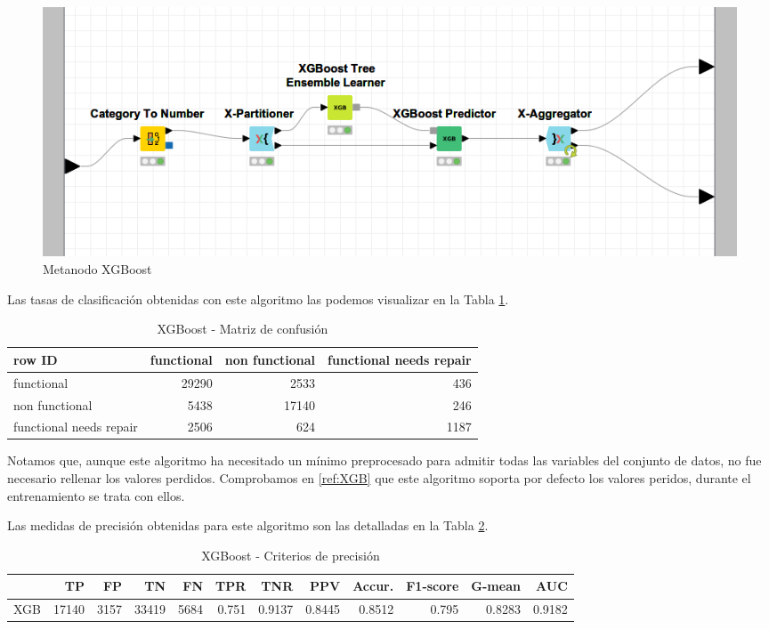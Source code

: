 \documentclass[a4paper, 20pt]{article}
\begin{document}
\begin{figure}[H]
    \centering
    \includegraphics[width=1\textwidth]{XGBoost}
    \caption{Metanodo XGBoost}
    \label{fig:XGBoost}
\end{figure}

Las tasas de clasificación obtenidas con este algoritmo las podemos visualizar en la Tabla \ref{tab:CMXGB}.

\begin{table}[H]
  \centering
  \caption{XGBoost - Matriz de confusión}
  \label{tab:CMXGB} 
  \begin{tabular}{lrrr}
    \toprule
    row ID & functional & non functional & functional needs repair\\ \midrule
    functional & 29290 & 2533 & 436\\
    non functional & 5438 & 17140 & 246\\
    functional needs repair & 2506 & 624 & 1187\\
    \bottomrule
  \end{tabular}
\end{table}

Notamos que, aunque este algoritmo ha necesitado un mínimo preprocesado para admitir todas las variables del conjunto de datos, no fue necesario rellenar los valores perdidos. Comprobamos en \ref{ref:XGB} que este algoritmo soporta por defecto los valores peridos, durante el entrenamiento se trata con ellos.

Las medidas de precisión obtenidas para este algoritmo son las detalladas en la Tabla \ref{tab:XGB}.

\begin{table}[H]
\centering
\caption{XGBoost - Criterios de precisión}
\label{tab:XGB}
\begin{tabular}{lrrrrrrrrrrr}
\toprule
 & TP & FP & TN & FN & TPR & TNR & PPV & Accur. & F1-score & G-mean & AUC\\ \midrule
XGB & 17140 & 3157 & 33419 & 5684 & 0.751 & 0.9137 & 0.8445 & 0.8512 & 0.795 & 0.8283 & 0.9182\\
\bottomrule
\end{tabular}
\end{table}
\end{document}
